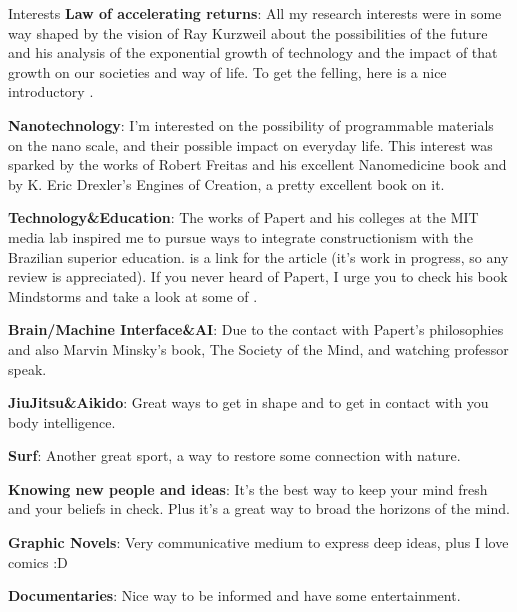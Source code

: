 \begin{rubric}{Interests}
    \entry* \textbf{Law of accelerating returns}: All my research interests were
    in some way shaped by the vision of Ray Kurzweil about the possibilities of
    the future and his analysis of the exponential growth of technology and the
    impact of that growth on our societies and way of life. To get the felling,
    here is a nice introductory
    .


    \entry* \textbf{Nanotechnology}: I'm interested on the possibility of
    programmable materials on the nano scale, and their possible impact on
    everyday life. This interest was sparked by the works of Robert Freitas and
    his excellent Nanomedicine book and by K. Eric Drexler's Engines of
    Creation, a pretty excellent book on it. 

    \entry* \textbf{Technology\&Education}: The works of Papert and his colleges
    at the MIT media lab inspired me to pursue ways to integrate constructionism
    with the Brazilian superior education.
    is a link for the article (it's work in progress, so any review is
    appreciated). If you never heard of Papert, I urge you to check his book
    Mindstorms and take a look at some of
    .

    \entry* \textbf{Brain/Machine Interface\&AI}: Due to the contact with
    Papert's philosophies and also Marvin Minsky's book, The Society of the
    Mind, and watching professor 
    speak.

    \entry* \textbf{JiuJitsu\&Aikido}: Great ways to get in shape and to get in
        contact with you body intelligence.

    \entry* \textbf{Surf}: Another great sport, a way to restore some connection
    with nature.

    \entry* \textbf{Knowing new people and ideas}: It's the best way to keep
    your mind fresh and your beliefs in check. Plus it's a great way to broad
    the horizons of the mind.

    \entry* \textbf{Graphic Novels}: Very communicative medium to express deep
    ideas, plus I love comics :D

    \entry* \textbf{Documentaries}: Nice way to be informed and have some
    entertainment. 

\end{rubric}

